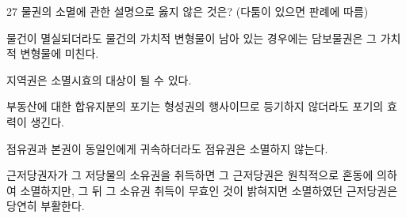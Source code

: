 \begin{question}{27}
물권의 소멸에 관한 설명으로 옳지 않은 것은? (다툼이 있으면 판례에 따름)
\begin{choices}
  \item 물건이 멸실되더라도 물건의 가치적 변형물이 남아 있는 경우에는 담보물권은 그 가치적 변형물에 미친다.
  \item 지역권은 소멸시효의 대상이 될 수 있다.
  \item 부동산에 대한 합유지분의 포기는 형성권의 행사이므로 등기하지 않더라도 포기의 효력이 생긴다.
  \item 점유권과 본권이 동일인에게 귀속하더라도 점유권은 소멸하지 않는다.
  \item 근저당권자가 그 저당물의 소유권을 취득하면 그 근저당권은 원칙적으로 혼동에 의하여 소멸하지만, 그 뒤 그 소유권 취득이 무효인 것이 밝혀지면 소멸하였던 근저당권은 당연히 부활한다.
\end{choices}
\end{question}
